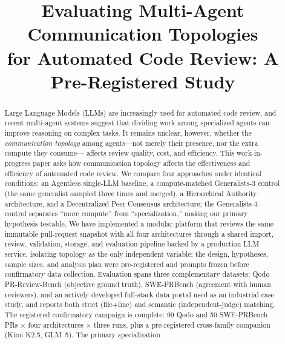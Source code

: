 \documentclass[conference]{IEEEtran}
\begin{document}
\title{Evaluating Multi-Agent Communication Topologies\\
for Automated Code Review: A Pre-Registered Study}

\author{
}

\maketitle

\begin{abstract}
Large Language Models (LLMs) are increasingly used for automated code
review, and recent multi-agent systems suggest that dividing work among
specialized agents can improve reasoning on complex tasks. It remains
unclear, however, whether the \emph{communication topology} among
agents---not merely their presence, nor the extra compute they consume---
affects review quality, cost, and efficiency. This work-in-progress paper
asks how communication topology affects the effectiveness and efficiency of
automated code review. We compare four approaches under identical
conditions: an Agentless single-LLM baseline, a compute-matched
Generalists-3 control (the same generalist sampled three times and merged),
a Hierarchical Authority architecture, and a Decentralized Peer Consensus
architecture; the Generalists-3 control separates ``more compute'' from
``specialization,'' making our primary hypothesis testable. We have
implemented a modular platform that reviews the same immutable pull-request
snapshot with all four architectures through a shared import, review,
validation, storage, and evaluation pipeline backed by a production LLM
service, isolating topology as the only independent variable; the design,
hypotheses, sample sizes, and analysis plan were pre-registered and prompts
frozen before confirmatory data collection. Evaluation spans three
complementary datasets: Qodo PR-Review-Bench (objective ground truth),
SWE-PRBench (agreement with human reviewers), and an actively developed
full-stack data portal used as an industrial case study, and reports both
strict (file+line) and semantic (independent-judge) matching. The
registered confirmatory campaign is complete: 99 Qodo and 50 SWE-PRBench
PRs $\times$ four architectures $\times$ three runs, plus a pre-registered
cross-family companion (Kimi K2.5, GLM~5). The primary specialization

\end{abstract}
\end{document}
